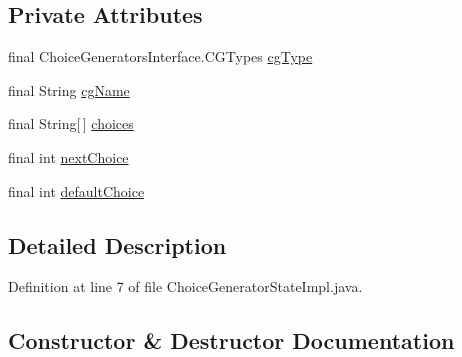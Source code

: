 \subsection*{Private Attributes}
\begin{DoxyCompactItemize}
\item 
final Choice\+Generators\+Interface.\+C\+G\+Types \hyperlink{classgov_1_1nasa_1_1jpf_1_1inspector_1_1server_1_1choicegenerators_1_1_choice_generator_state_impl_a5d7f2a3bd122308e6e9a169418389ca7}{cg\+Type}
\item 
final String \hyperlink{classgov_1_1nasa_1_1jpf_1_1inspector_1_1server_1_1choicegenerators_1_1_choice_generator_state_impl_a238a8f39d5e053f72aedb9581929a0da}{cg\+Name}
\item 
final String\mbox{[}$\,$\mbox{]} \hyperlink{classgov_1_1nasa_1_1jpf_1_1inspector_1_1server_1_1choicegenerators_1_1_choice_generator_state_impl_a1b6cb0074743d6d984f3a0cac6858a45}{choices}
\item 
final int \hyperlink{classgov_1_1nasa_1_1jpf_1_1inspector_1_1server_1_1choicegenerators_1_1_choice_generator_state_impl_ac8fb04c5a3d70c3f32cd001050019044}{next\+Choice}
\item 
final int \hyperlink{classgov_1_1nasa_1_1jpf_1_1inspector_1_1server_1_1choicegenerators_1_1_choice_generator_state_impl_a2d4c8c4cbf01db6442c408e1994be685}{default\+Choice}
\end{DoxyCompactItemize}


\subsection{Detailed Description}


Definition at line 7 of file Choice\+Generator\+State\+Impl.\+java.



\subsection{Constructor \& Destructor Documentation}
